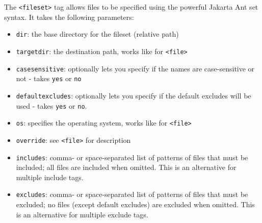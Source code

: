 The \texttt{<fileset>} tag allows files to be specified using the powerful
Jakarta Ant set syntax. It takes the following parameters:

\begin{itemize}

  \item \texttt{dir}: the base directory for the fileset (relative path)

  \item \texttt{targetdir}: the destination path, works like for
  \texttt{<file>}

  \item \texttt{casesensitive}: optionally lets you specify if the names
  are case-sensitive or not - takes \texttt{yes} or \texttt{no}

  \item \texttt{defaultexcludes}: optionally lets you specify if the default
  excludes will be used - takes \texttt{yes} or \texttt{no}.

  \item \texttt{os}: specifies the operating system, works like for
  \texttt{<file>}

  \item \texttt{override}: see \texttt{<file>} for description

  \item \texttt{includes}: comma- or space-separated list of patterns of
  files that must be included; all files are included when omitted.
  This is an alternative for multiple include tags.

  \item \texttt{excludes}: comma- or space-separated list of patterns of
  files that must be excluded; no files (except default excludes) are
  excluded when omitted. This is an alternative for multiple exclude tags.

\end{itemize}

